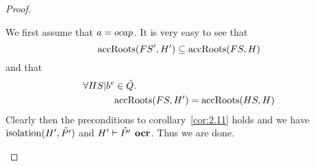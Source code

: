 \begin{proof}
\begin{description}
\begin{description}
          We first assume that $a = \mbox{$ocap$}$. It is very
          easy to see that
          \begin{equation}
            \mbox{$\mathrm{accRoots}$}(FS', H') \subseteq \mbox{$\mathrm{accRoots}$}(FS, H)
          \end{equation}
          and that
          \begin{equation}
            \begin{aligned}
              \forall HS|b^e &\in \tilde{Q}. \\
              &\mbox{$\mathrm{accRoots}$}(FS, H') = \mbox{$\mathrm{accRoots}$}(HS, H)
            \end{aligned}
          \end{equation}
          Clearly then the preconditions to corollary~\ref{cor:2.11} holds and
          we have $\mbox{$\mathrm{isolation}$}(H', \tilde{P'})$ and $H' \vdash \tilde{P'} \:\:
          \mbox{\bf ocr}$. Thus we are done.


\end{description}
\end{description}
\end{proof}
